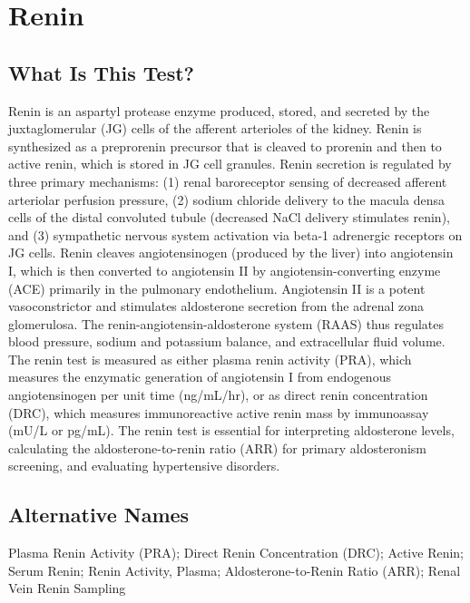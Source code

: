 \chapter{Renin}

\section*{What Is This Test?}
Renin is an aspartyl protease enzyme produced, stored, and secreted by the juxtaglomerular (JG) cells of the afferent arterioles of the kidney. Renin is synthesized as a preprorenin precursor that is cleaved to prorenin and then to active renin, which is stored in JG cell granules. Renin secretion is regulated by three primary mechanisms: (1) renal baroreceptor sensing of decreased afferent arteriolar perfusion pressure, (2) sodium chloride delivery to the macula densa cells of the distal convoluted tubule (decreased NaCl delivery stimulates renin), and (3) sympathetic nervous system activation via beta-1 adrenergic receptors on JG cells. Renin cleaves angiotensinogen (produced by the liver) into angiotensin I, which is then converted to angiotensin II by angiotensin-converting enzyme (ACE) primarily in the pulmonary endothelium. Angiotensin II is a potent vasoconstrictor and stimulates aldosterone secretion from the adrenal zona glomerulosa. The renin-angiotensin-aldosterone system (RAAS) thus regulates blood pressure, sodium and potassium balance, and extracellular fluid volume. The renin test is measured as either plasma renin activity (PRA), which measures the enzymatic generation of angiotensin I from endogenous angiotensinogen per unit time (ng/mL/hr), or as direct renin concentration (DRC), which measures immunoreactive active renin mass by immunoassay (mU/L or pg/mL). The renin test is essential for interpreting aldosterone levels, calculating the aldosterone-to-renin ratio (ARR) for primary aldosteronism screening, and evaluating hypertensive disorders.

\section*{Alternative Names}
Plasma Renin Activity (PRA); Direct Renin Concentration (DRC); Active Renin; Serum Renin; Renin Activity, Plasma; Aldosterone-to-Renin Ratio (ARR); Renal Vein Renin Sampling

